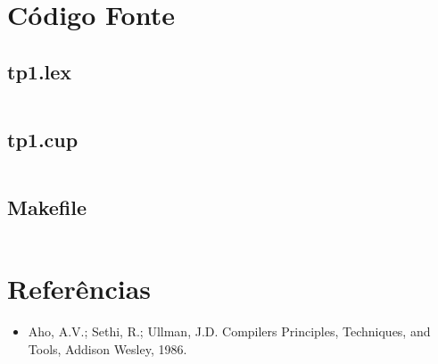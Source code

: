 \documentclass[a4paper,12pt]{report}
\begin{document}
\section{Código Fonte}

\subsection{tp1.lex}

\begin{mdframed}[linecolor=black, leftline=false, rightline=false, backgroundcolor=gray!20!white]
    \inputminted[linenos, fontsize=\footnotesize]{text}{../src/tp1.lex}
\end{mdframed}

\subsection{tp1.cup}

\begin{mdframed}[linecolor=black, leftline=false, rightline=false, backgroundcolor=gray!20!white]
    \inputminted[linenos, fontsize=\footnotesize]{text}{../src/tp1.cup}
\end{mdframed}

\subsection{Makefile}

\begin{mdframed}[linecolor=black, leftline=false, rightline=false, backgroundcolor=gray!20!white]
    \inputminted[linenos, fontsize=\footnotesize]{text}{../src/Makefile}
\end{mdframed}

\section{Referências}

\begin{itemize}
 \item Aho, A.V.; Sethi, R.; Ullman, J.D. Compilers Principles, Techniques, and
 Tools, Addison Wesley, 1986.
\end{itemize}
\end{document}
